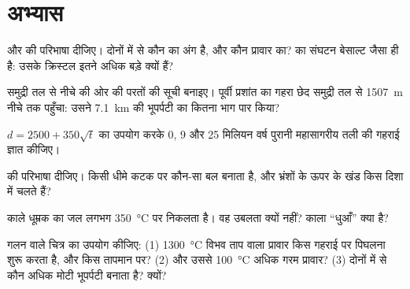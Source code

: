 \section{अभ्यास}

\begin{exercise}[$\star$]\label{exo:g11:ocean-ridges:1}
 और  की परिभाषा दीजिए। दोनों में से कौन  का अंग है,
और कौन प्रावार का?  का संघटन बेसाल्ट जैसा ही है: उसके
क्रिस्टल इतने अधिक बड़े क्यों हैं?
\end{exercise}

\begin{exercise}[$\star$]\label{exo:g11:ocean-ridges:2}
समुद्री तल से नीचे की ओर  की परतों की सूची बनाइए। पूर्वी
प्रशांत का गहरा छेद समुद्री तल से \qty{1507}{m} नीचे तक पहुँचा: उसने
\qty{7.1}{km} की भूपर्पटी का कितना भाग पार किया?
\end{exercise}

\begin{exercise}[$\star$]\label{exo:g11:ocean-ridges:3}
$d = 2500 + 350\sqrt{t}$ का उपयोग करके 0, 9 और 25
मिलियन वर्ष पुरानी महासागरीय तली की गहराई ज्ञात कीजिए।
\end{exercise}

\begin{exercise}[$\star$]\label{exo:g11:ocean-ridges:4}
 की परिभाषा दीजिए। किसी धीमे कटक पर कौन-सा बल  बनाता है, और
भ्रंशों के ऊपर के खंड किस दिशा में चलते हैं?
\end{exercise}

\begin{exercise}[$\star$]\label{exo:g11:ocean-ridges:5}
काले धूम्रक का जल लगभग \qty{350}{\celsius} पर निकलता है। वह
उबलता क्यों नहीं? काला ``धुआँ'' क्या है?
\end{exercise}

\begin{exercise}[$\star\star$]\label{exo:g11:ocean-ridges:6}
गलन वाले चित्र का उपयोग कीजिए: (1) \qty{1300}{\celsius} विभव
ताप वाला प्रावार किस गहराई पर पिघलना शुरू करता है, और किस तापमान पर? (2)
और उससे \qty{100}{\celsius} अधिक गरम प्रावार? (3) दोनों में से कौन
अधिक मोटी भूपर्पटी बनाता है? क्यों?
\end{exercise}


